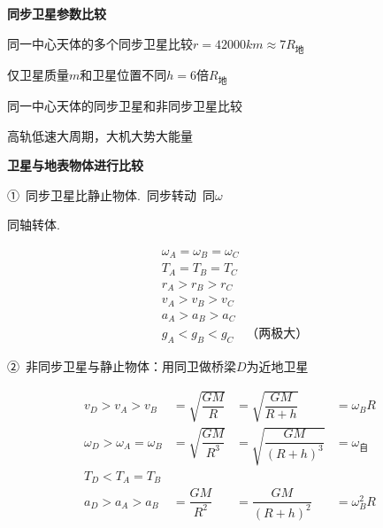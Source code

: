 \textbf{同步卫星参数比较}

同一中心天体的多个同步卫星比较\hfill $r=42000\unit{km}\approx7R_{\text{地}}$

\hspace*{2em}仅卫星质量$m$和卫星位置不同\hfill $h=6$倍$R_{\text{地}}$

同一中心天体的同步卫星和非同步卫星比较

\hspace*{4em}高轨低速大周期，大机大势大能量

\textbf{卫星与地表物体进行比较}

①\ 同步卫星比静止物体.\ 同步转动\ 同$\omega$

同轴转体.%


\[
\begin{aligned}
&\omega_A=\omega_B=\omega_C\\
&T_A=T_B=T_C\\
&r_A>r_B>r_C\\
&v_A>v_B>v_C\\
&a_A>a_B>a_C\\
&g_A<g_B<g_C\quad\text{（两极大）}
\end{aligned}
\]

②\ 非同步卫星与静止物体：用同卫做桥梁\quad $D$为近地卫星%

\[
\begin{array}{llll}
v_D>v_A>v_B & =\sqrt{\dfrac{GM}{R}} & =\sqrt{\dfrac{GM}{R+h}} & =\omega_BR\\[8pt]
\omega_D>\omega_A=\omega_B & =\sqrt{\dfrac{GM}{R^{3}}} & =\sqrt{\dfrac{GM}{(R+h)^{3}}} & =\omega_{\text{自}}\\[8pt]
T_D<T_A=T_B & & & \\[4pt]
a_D>a_A>a_B & =\dfrac{GM}{R^{2}} & =\dfrac{GM}{(R+h)^{2}} & =\omega_B^{2}R
\end{array}
\]


